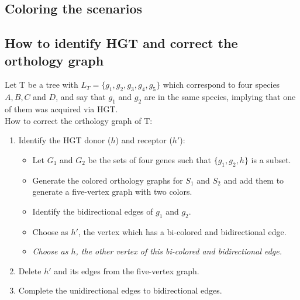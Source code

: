 \documentclass[10pt,a4paper,notitlepage]{article}
\begin{document}
\subsection{Coloring the scenarios}

\subsection{How to identify HGT and correct the orthology graph}
	Let T be a tree with $L_T=\{ g_1, g_2, g_3, g_4, g_5\}$ which correspond to four species $A, B, C$ and $D$, and say that $g_1$ and $g_2$ are in the same species, implying that one of them was acquired via HGT. 
	\\
	How to correct the orthology graph of T:
	\begin{enumerate}
		\item Identify the HGT donor ($h$) and receptor ($h'$):
			\begin{itemize}
				\item Let $G_1$ and $G_2$ be the sets of four genes such that $\{g_1, g_2, h\}$ is a subset.
				\item Generate the colored orthology graphs for $S_1$ and $S_2$ and add them to generate a five-vertex graph with 					two colors.
				\item Identify the bidirectional edges of $g_1$ and $g_2$.
				\item Choose as $h'$, the vertex which has a bi-colored and bidirectional edge.
				\item \textit{Choose as $h$, the other vertex of this bi-colored and bidirectional edge.}
			\end{itemize}
		\item Delete $h'$ and its edges from the five-vertex graph.
		\item Complete the unidirectional edges to bidirectional edges. 
	\end{enumerate}
	
\end{document}
